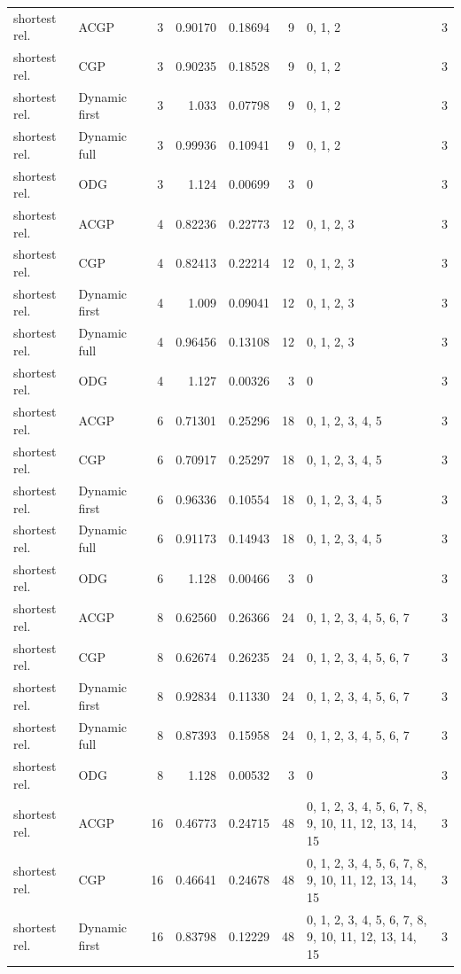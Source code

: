 \documentclass[10pt,a4paper]{article}
\begin{document}
\begin{longtable}{@{}p{23mm}p{29mm}rrrrp{36mm}r@{}}
shortest rel. & ACGP & 3 & 0.90170 & 0.18694 & 9 & 0, 1, 2 & 3 \\
shortest rel. & CGP & 3 & 0.90235 & 0.18528 & 9 & 0, 1, 2 & 3 \\
shortest rel. & Dynamic first & 3 & 1.033 & 0.07798 & 9 & 0, 1, 2 & 3 \\
shortest rel. & Dynamic full & 3 & 0.99936 & 0.10941 & 9 & 0, 1, 2 & 3 \\
shortest rel. & ODG & 3 & 1.124 & 0.00699 & 3 & 0 & 3 \\
shortest rel. & ACGP & 4 & 0.82236 & 0.22773 & 12 & 0, 1, 2, 3 & 3 \\
shortest rel. & CGP & 4 & 0.82413 & 0.22214 & 12 & 0, 1, 2, 3 & 3 \\
shortest rel. & Dynamic first & 4 & 1.009 & 0.09041 & 12 & 0, 1, 2, 3 & 3 \\
shortest rel. & Dynamic full & 4 & 0.96456 & 0.13108 & 12 & 0, 1, 2, 3 & 3 \\
shortest rel. & ODG & 4 & 1.127 & 0.00326 & 3 & 0 & 3 \\
shortest rel. & ACGP & 6 & 0.71301 & 0.25296 & 18 & 0, 1, 2, 3, 4, 5 & 3 \\
shortest rel. & CGP & 6 & 0.70917 & 0.25297 & 18 & 0, 1, 2, 3, 4, 5 & 3 \\
shortest rel. & Dynamic first & 6 & 0.96336 & 0.10554 & 18 & 0, 1, 2, 3, 4, 5 & 3 \\
shortest rel. & Dynamic full & 6 & 0.91173 & 0.14943 & 18 & 0, 1, 2, 3, 4, 5 & 3 \\
shortest rel. & ODG & 6 & 1.128 & 0.00466 & 3 & 0 & 3 \\
shortest rel. & ACGP & 8 & 0.62560 & 0.26366 & 24 & 0, 1, 2, 3, 4, 5, 6, 7 & 3 \\
shortest rel. & CGP & 8 & 0.62674 & 0.26235 & 24 & 0, 1, 2, 3, 4, 5, 6, 7 & 3 \\
shortest rel. & Dynamic first & 8 & 0.92834 & 0.11330 & 24 & 0, 1, 2, 3, 4, 5, 6, 7 & 3 \\
shortest rel. & Dynamic full & 8 & 0.87393 & 0.15958 & 24 & 0, 1, 2, 3, 4, 5, 6, 7 & 3 \\
shortest rel. & ODG & 8 & 1.128 & 0.00532 & 3 & 0 & 3 \\
shortest rel. & ACGP & 16 & 0.46773 & 0.24715 & 48 & 0, 1, 2, 3, 4, 5, 6, 7, 8, 9, 10, 11, 12, 13, 14, 15 & 3 \\
shortest rel. & CGP & 16 & 0.46641 & 0.24678 & 48 & 0, 1, 2, 3, 4, 5, 6, 7, 8, 9, 10, 11, 12, 13, 14, 15 & 3 \\
shortest rel. & Dynamic first & 16 & 0.83798 & 0.12229 & 48 & 0, 1, 2, 3, 4, 5, 6, 7, 8, 9, 10, 11, 12, 13, 14, 15 & 3 \\

\end{longtable}
\end{document}
